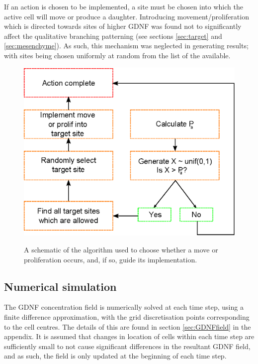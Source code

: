 \documentclass[pdftex,10pt,a4paper,twocolumn]{article}
\begin{document}
If an action is chosen to be implemented, a site must be chosen into which the active cell will move or produce a daughter. Introducing movement/proliferation which is directed towards sites of higher GDNF was found not to significantly affect the qualitative branching patterning (see sections \ref{sec:target} and \ref{sec:mesenchyme}). As such, this mechanism was neglected in generating results; with sites being chosen uniformly at random from the list of the available.

\begin{figure}[t] 
\centering
\scalebox{0.7} 
{\includegraphics{algorithm_specific_nochemo.eps}}
\caption{A schematic of the algorithm used to choose whether a move or proliferation occurs, and, if so, guide its implementation.}\label{fig:algorithm_specific}
\end{figure}

\subsection{Numerical simulation}
The GDNF concentration field is numerically solved at each time step, using a finite difference approximation, with the grid discretisation points corresponding to the cell centres. The details of this are found in section \ref{sec:GDNFfield} in the appendix. It is assumed that changes in location of cells within each time step are sufficiently small to not cause significant differences in the resultant GDNF field, and as such, the field is only updated at the beginning of each time step.
\end{document}
